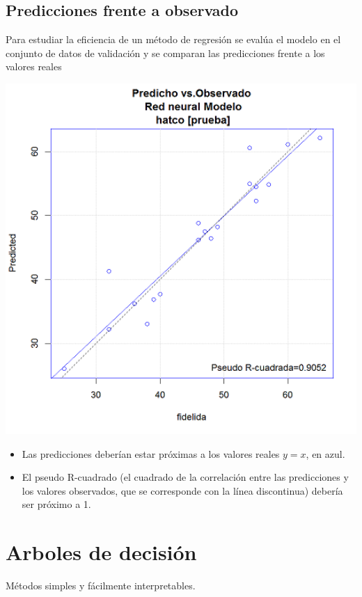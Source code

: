 \documentclass[]{book}
\begin{document}
\subsection{Predicciones frente a
observado}\label{predicciones-frente-a-observado}

Para estudiar la eficiencia de un método de regresión se evalúa el
modelo en el conjunto de datos de validación y se comparan las
predicciones frente a los valores reales

\includegraphics[width=6.38in]{images/predobs}

\begin{itemize}
\item
  Las predicciones deberían estar próximas a los valores reales \(y=x\),
  en azul.
\item
  El pseudo R-cuadrado (el cuadrado de la correlación entre las
  predicciones y los valores observados, que se corresponde con la línea
  discontinua) debería ser próximo a 1.
\end{itemize}

\section{Arboles de decisión}\label{arboles-de-decisiuxf3n}

Métodos simples y fácilmente interpretables.
\end{document}
